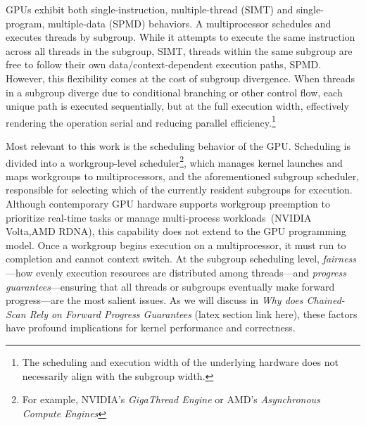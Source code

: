 \documentclass[sigconf]{acmart}
\begin{document}
GPUs exhibit both single-instruction, multiple-thread (SIMT) and single-program, multiple-data (SPMD) behaviors. A multiprocessor schedules and executes threads by subgroup. While it attempts to execute the same instruction across all threads in the subgroup, SIMT, threads within the same subgroup are free to follow their own data/context-dependent execution paths, SPMD. However, this flexibility comes at the cost of subgroup divergence. When threads in a subgroup diverge due to conditional branching or other control flow, each unique path is executed sequentially, but at the full execution width, effectively rendering the operation serial and reducing parallel efficiency.\footnote{The scheduling and execution width of the underlying hardware does not necessarily align with the subgroup width.}

Most relevant to this work is the scheduling behavior of the GPU. Scheduling is divided into a workgroup-level scheduler\footnote{For example, NVIDIA's \emph{GigaThread Engine} or AMD's \emph{Asynchronous Compute Engines}}, which manages kernel launches and maps workgroups to multiprocessors, and the aforementioned subgroup scheduler, responsible for selecting which of the currently resident subgroups for execution. Although contemporary GPU hardware supports workgroup preemption to prioritize real-time tasks or manage multi-process workloads~\cite{}(NVIDIA Volta,AMD RDNA), this capability does not extend to the GPU programming model. Once a workgroup begins execution on a multiprocessor, it must run to completion and cannot context switch. At the subgroup scheduling level, \emph{fairness}—how evenly execution resources are distributed among threads—and \emph{progress guarantees}—ensuring that all threads or subgroups eventually make forward progress—are the most salient issues. As we will discuss in \emph{Why does \emph{Chained-Scan} Rely on Forward Progress Guarantees} (latex section link here), these factors have profound implications for kernel performance and correctness.
\end{document}
